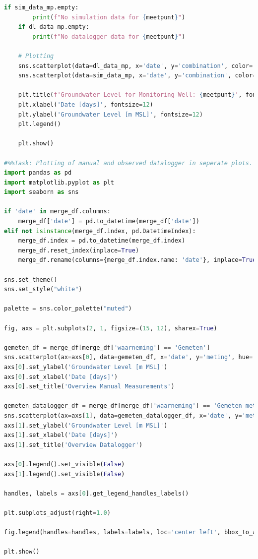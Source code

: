 \begin{lstlisting}[language=Python]
    if sim_data_mp.empty:
        print(f"No simulation data for {meetpunt}")
    if dl_data_mp.empty:
        print(f"No datalogger data for {meetpunt}")

    # Plotting
    sns.scatterplot(data=dl_data_mp, x='date', y='combination', color='pink', label='Data Logger', s=10)  # Increased size for visibility
    sns.scatterplot(data=sim_data_mp, x='date', y='combination', color='green', label='Simulation', s=10)  # Same here

    plt.title(f'Groundwater Level for Monitoring Well: {meetpunt}', fontsize=12)
    plt.xlabel('Date [days]', fontsize=12)
    plt.ylabel('Groundwater Level [m MSL]', fontsize=12)
    plt.legend()

    plt.show()

#%%Task: Plotting of manual and observed datalogger in seperate plots. 
import pandas as pd
import matplotlib.pyplot as plt
import seaborn as sns

if 'date' in merge_df.columns:
    merge_df['date'] = pd.to_datetime(merge_df['date'])
elif not isinstance(merge_df.index, pd.DatetimeIndex):
    merge_df.index = pd.to_datetime(merge_df.index)
    merge_df.reset_index(inplace=True)
    merge_df.rename(columns={merge_df.index.name: 'date'}, inplace=True)

sns.set_theme()
sns.set_style("white")

palette = sns.color_palette("muted")

fig, axs = plt.subplots(2, 1, figsize=(15, 12), sharex=True)

gemeten_df = merge_df[merge_df['waarneming'] == 'Gemeten']
sns.scatterplot(ax=axs[0], data=gemeten_df, x='date', y='meting', hue='meetpunt', s=10)
axs[0].set_ylabel('Groundwater Level [m MSL]')
axs[0].set_xlabel('Date [days]')
axs[0].set_title('Overview Manual Measurements')

gemeten_datalogger_df = merge_df[merge_df['waarneming'] == 'Gemeten met datalogger']
sns.scatterplot(ax=axs[1], data=gemeten_datalogger_df, x='date', y='meting', hue='meetpunt', s=10)
axs[1].set_ylabel('Groundwater Level [m MSL]')
axs[1].set_xlabel('Date [days]')
axs[1].set_title('Overview Datalogger')

axs[0].legend().set_visible(False)
axs[1].legend().set_visible(False)

handles, labels = axs[0].get_legend_handles_labels()

plt.subplots_adjust(right=1.0)

fig.legend(handles=handles, labels=labels, loc='center left', bbox_to_anchor=(1.02, 0.5), title='Meetpunt')

plt.show()
\end{lstlisting}

